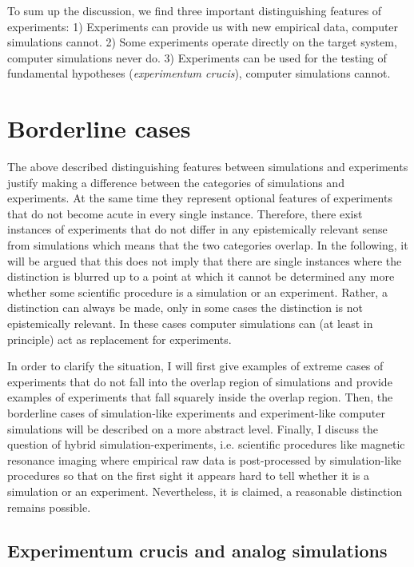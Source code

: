 \documentclass[onecollarge]{STJour}
\numberwithin{equation}{section}
\begin{document}
\label{differencesConclusions}
To sum up the discussion, we find three important distinguishing
features of experiments: 1) Experiments can provide us with new empirical data, computer simulations cannot. 2) Some experiments operate directly on the target system, computer simulations never do. 3) Experiments can be used for the testing of fundamental hypotheses ({\em experimentum crucis}), computer simulations cannot.


\section{Borderline cases}

The above described distinguishing features between simulations and experiments justify making a difference between the categories of simulations and experiments. At the same time they represent optional features of experiments that do not become acute in every single instance. Therefore, there exist instances of experiments that do not differ in any epistemically relevant sense from simulations which means that the two categories overlap. In the following, it will be argued that this does not imply that there are single instances where the distinction is blurred up to a point at which it cannot be determined any more whether some scientific procedure is a simulation or an experiment. Rather, a distinction can always be made, only in some cases the distinction is not epistemically relevant. In these cases computer simulations can (at least in principle) act as replacement for experiments.

In order to clarify the situation, I will first give examples of extreme cases of experiments that do not fall into the overlap region of simulations and provide examples of experiments that fall squarely inside the overlap region. Then, the borderline cases of simulation-like experiments and experiment-like computer simulations will be described on a more abstract level. Finally, I discuss the question of hybrid simulation-experiments, i.e. scientific procedures like magnetic resonance imaging where empirical raw data is post-processed by simulation-like procedures so that on the first sight it appears hard to tell whether it is a simulation or an experiment. Nevertheless, it is claimed, a reasonable distinction remains possible.


\subsection{Experimentum crucis and analog simulations}
\end{document}
